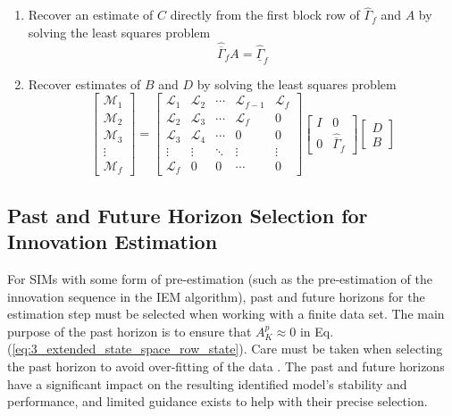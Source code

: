 \begin{table}[!htb]
{\begin{minipage}{5.5in}
\begin{enumerate}
\item Recover an estimate of $C$ directly from the first block row of $\hat{\Gamma}_f$ and $A$ by solving the least squares problem
\begin{equation*}
\hat{\overline{\Gamma}}_f A = \hat{\underline{\Gamma}}_f
\end{equation*}

\item Recover estimates of $B$ and $D$ by solving the least squares problem
\begin{equation*}
\begin{bmatrix}\mathcal{M}_1\\ \mathcal{M}_2\\ \mathcal{M}_3\\ \vdots\\ \mathcal{M}_f\end{bmatrix} = 
\begin{bmatrix}
\mathcal{L}_1 & \mathcal{L}_2 & \cdots & \mathcal{L}_{f-1} & \mathcal{L}_f\\
\mathcal{L}_2 & \mathcal{L}_3 & \cdots & \mathcal{L}_{f} & 0\\
\mathcal{L}_3 & \mathcal{L}_4 & \cdots & 0 & 0\\
\vdots & \vdots & \ddots & \vdots & \vdots\\
\mathcal{L}_f & 0 & 0 & \cdots & 0
\end{bmatrix}
\begin{bmatrix}I & 0\\ 0 & \hat{\overline{\Gamma}}_f\end{bmatrix}
\begin{bmatrix}D \\ B\end{bmatrix}
\end{equation*}
\end{enumerate}
\end{minipage}}
\label{iem_overview}
\end{table}


\subsection{Past and Future Horizon Selection for Innovation Estimation}\label{sec:past_and_future_horizon_selection}
For SIMs with some form of pre-estimation (such as the pre-estimation of the innovation sequence in the IEM algorithm), past and future horizons for the estimation step must be selected when working with a finite data set. The main purpose of the past horizon is to ensure that $A_K^p \approx 0$ in Eq. (\ref{eq:3_extended_state_space_row_state}). Care must be taken when selecting the past horizon to avoid over-fitting of the data \cite{van2013closed}. The past and future horizons have a significant impact on the resulting identified model's stability and performance, and limited guidance exists to help with their precise selection. 

